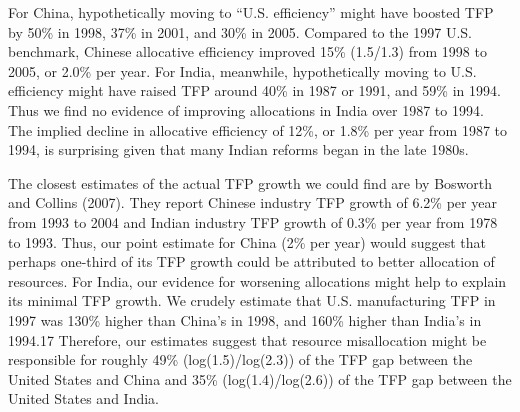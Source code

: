 \documentclass{article}
\begin{document}
For China, hypothetically moving to “U.S. efficiency” might have boosted TFP by 50\% in 1998, 37\% in 2001, and 30\% in 2005. Compared to the 1997 U.S. benchmark, Chinese allocative efficiency improved 15\% (1.5/1.3) from 1998 to 2005, or 2.0\% per year. For India, meanwhile, hypothetically moving to U.S. efficiency might have raised TFP around 40\% in 1987 or 1991, and 59\% in 1994. Thus we find no evidence of improving allocations in India over 1987 to 1994. The implied decline in allocative efficiency of 12\%, or 1.8\% per year from 1987 to 1994, is surprising given that many Indian reforms began in the late 1980s.

The closest estimates of the actual TFP growth we could find are by Bosworth and Collins (2007). They report Chinese industry TFP growth of 6.2\% per year from 1993 to 2004 and Indian industry TFP growth of 0.3\% per year from 1978 to 1993. Thus, our point estimate for China (2\% per year) would suggest that perhaps one-third of its TFP growth could be attributed to better allocation of resources. For India, our evidence for worsening allocations might help to explain its minimal TFP growth. We crudely estimate that U.S. manufacturing TFP in 1997 was 130\% higher than China’s in 1998, and 160\% higher than India’s in 1994.17 Therefore, our estimates suggest that resource misallocation might be responsible for roughly 49\% (log(1.5)/log(2.3)) of the TFP gap between the United States and China and 35\% (log(1.4)/log(2.6)) of the TFP gap between the United States and India.
\end{document}
